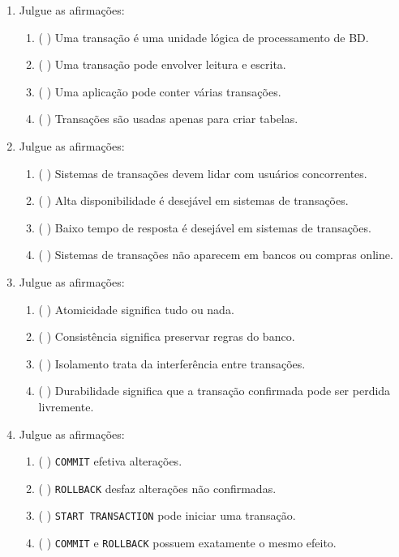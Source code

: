 \documentclass[12pt,a4paper]{article}
\begin{document}
\begin{enumerate}[resume,label=\textbf{Q\arabic*.}]

\item Julgue as afirmações:

\begin{enumerate}[label=\alph*)]
    \item ( \quad ) Uma transação é uma unidade lógica de processamento de BD.
    \item ( \quad ) Uma transação pode envolver leitura e escrita.
    \item ( \quad ) Uma aplicação pode conter várias transações.
    \item ( \quad ) Transações são usadas apenas para criar tabelas.
\end{enumerate}

\item Julgue as afirmações:

\begin{enumerate}[label=\alph*)]
    \item ( \quad ) Sistemas de transações devem lidar com usuários concorrentes.
    \item ( \quad ) Alta disponibilidade é desejável em sistemas de transações.
    \item ( \quad ) Baixo tempo de resposta é desejável em sistemas de transações.
    \item ( \quad ) Sistemas de transações não aparecem em bancos ou compras online.
\end{enumerate}

\item Julgue as afirmações:

\begin{enumerate}[label=\alph*)]
    \item ( \quad ) Atomicidade significa tudo ou nada.
    \item ( \quad ) Consistência significa preservar regras do banco.
    \item ( \quad ) Isolamento trata da interferência entre transações.
    \item ( \quad ) Durabilidade significa que a transação confirmada pode ser perdida livremente.
\end{enumerate}

\item Julgue as afirmações:

\begin{enumerate}[label=\alph*)]
    \item ( \quad ) \texttt{COMMIT} efetiva alterações.
    \item ( \quad ) \texttt{ROLLBACK} desfaz alterações não confirmadas.
    \item ( \quad ) \texttt{START TRANSACTION} pode iniciar uma transação.
    \item ( \quad ) \texttt{COMMIT} e \texttt{ROLLBACK} possuem exatamente o mesmo efeito.
\end{enumerate}


\end{enumerate}
\end{document}
